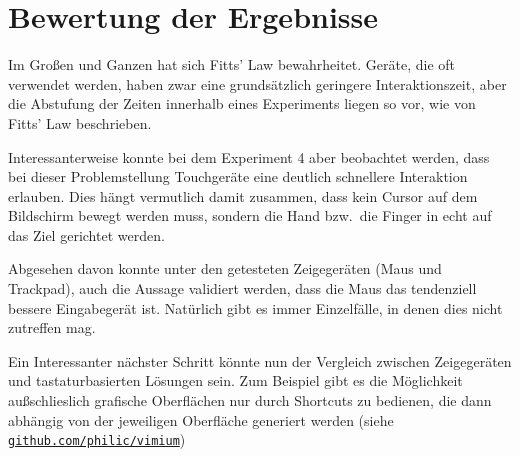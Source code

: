 \documentclass{article}
\begin{document}
\section{Bewertung der Ergebnisse}

Im Großen und Ganzen hat sich Fitts' Law bewahrheitet. Geräte, die oft verwendet
werden, haben zwar eine grundsätzlich geringere Interaktionszeit, aber die
Abstufung der Zeiten innerhalb eines Experiments liegen so vor, wie von Fitts'
Law beschrieben.

Interessanterweise konnte bei dem Experiment 4 aber beobachtet werden, dass bei
dieser Problemstellung Touchgeräte eine deutlich schnellere Interaktion erlauben.
Dies hängt vermutlich damit zusammen, dass kein Cursor auf dem Bildschirm bewegt
werden muss, sondern die Hand bzw.\ die Finger in echt auf das Ziel gerichtet
werden.

Abgesehen davon konnte unter den getesteten Zeigegeräten (Maus und Trackpad),
auch die Aussage validiert werden, dass die Maus das tendenziell bessere
Eingabegerät ist. Natürlich gibt es immer Einzelfälle, in denen dies nicht
zutreffen mag.

Ein Interessanter nächster Schritt könnte nun der Vergleich zwischen
Zeigegeräten und tastaturbasierten Lösungen sein. Zum Beispiel gibt es die
Möglichkeit außschlieslich grafische Oberflächen nur durch Shortcuts zu bedienen,
die dann abhängig von der jeweiligen Oberfläche generiert werden (siehe
\href{https://github.com/philc/vimium}{\texttt{github.com/philic/vimium}})
\end{document}
